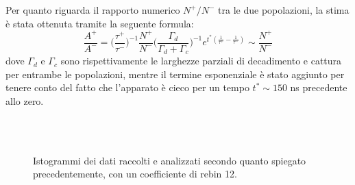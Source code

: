 \documentclass[10pt, oneside, a4paper]{article}   	%
\begin{document}
Per quanto riguarda il rapporto numerico $N^+/N^-$ tra le due popolazioni, la stima è stata ottenuta tramite la seguente formula: 
\[\frac{A^+}{A^-}= \bigg ( \frac{\tau^+}{\tau^-} \bigg )  ^{-1} \frac{N^+}{N^-} \bigg ( \frac{\Gamma_d}{\Gamma_d+\Gamma_c} \bigg )^{-1}e^{t^*\left(\frac{1}{\tau^+}-\frac{1}{\tau^-}\right)}\sim\frac{N^+}{N^-}\]
dove $\Gamma_d$ e $\Gamma_c$ sono rispettivamente le larghezze parziali di decadimento e cattura per entrambe le popolazioni, mentre il termine esponenziale è stato aggiunto per tenere conto del fatto che l'apparato è cieco per un tempo $t^* \sim 150$ ns precedente allo zero.
%
\begin{figure}[h!]
\centering
{} \\
 \\
\caption{Istogrammi dei dati raccolti e analizzati secondo quanto spiegato precedentemente, con un coefficiente di rebin 12.}
\label{fig::histo}
\end{figure}
\end{document}
